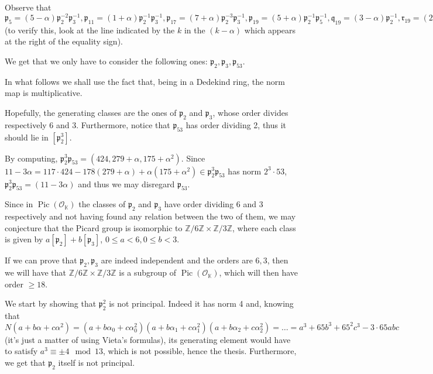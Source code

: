 \documentclass{article}
\newcommand{\numberset}{\mathbb}
\newcommand{\Z}{\numberset{Z}}
\newcommand{\K}{\numberset{K}}
\newcommand{\pid}{\mathfrak{p}}
\newcommand{\qid}{\mathfrak{q}}
\newcommand{\Pic}{\operatorname{Pic}}
\begin{document}
Observe that $\pid_5=(5-\alpha)\pid_2^{-2}\pid_3^{-1},\pid_{11}=(1+\alpha)\pid_2^{-1}\pid_3^{-1},\pid_{17}=(7+\alpha)\pid_2^{-3}\pid_3^{-1},\pid_{19}=(5+\alpha)\pid_2^{-1}\pid_5^{-1},\qid_{19}=(3-\alpha)\pid_2^{-1},\mathfrak{r}_{19}=(2-\alpha)\pid_3^{-1},\pid_{23}=(3+\alpha)\pid_2^{-2},\pid_{29}=(13+\alpha)\pid_3^{-1}\pid_{13}^{-1},\pid_{41}=(13-\alpha)\pid_2^{-2}\pid_{13}^{-1},\pid_{43}=(4+\alpha)\pid_3^{-1},\pid_{47}=(14-\alpha)\pid_3^{-1}\pid_{19}^{-1},\pid_{73}=(2+\alpha),\qid_{73}=(16+\alpha)\pid_3^{-1}\qid_{19}^{-1},\mathfrak{r}_{73}=(73)\pid_{73}^{-1}\qid_{73}^{-1}$ (to verify this, look at the line indicated by the $k$ in the $(k-\alpha)$ which appears at the right of the equality sign).

We get that we only have to consider the following ones: $\pid_2,\pid_3,\pid_{53}$.

In what follows we shall use the fact that, being in a Dedekind ring, the norm map is multiplicative.

Hopefully, the generating classes are the ones of $\pid_2$ and $\pid_3$, whose order divides respectively $6$ and $3$. Furthermore, notice that $\pid_{53}$ has order dividing 2, thus it should lie in $[\pid_2^3]$.

By computing, $\pid_2^3\pid_{53}=(424,279+\alpha,175+\alpha^2)$. Since $11-3\alpha=117\cdot 424-178(279+\alpha)+\alpha(175+\alpha^2)\in\pid_2^3\pid_{53}$ has norm $2^3\cdot 53$, $\pid_2^3\pid_{53}=(11-3\alpha)$ and thus we may disregard $\pid_{53}$.

Since in $\Pic(\mathcal{O}_{\K})$ the classes of $\pid_2$ and $\pid_3$ have order dividing 6 and 3 respectively and not having found any relation between the two of them, we may conjecture that the Picard group is isomorphic to $\Z/6\Z\times\Z/3\Z$, where each class is given by $a[\pid_2]+b[\pid_3]$, $0\leq a<6,0\leq b<3$.

If we can prove that $\pid_2,\pid_3$ are indeed independent and the orders are $6,3$, then we will have that $\Z/6\Z\times\Z/3\Z$ is a subgroup of $\Pic(\mathcal{O}_{\K})$, which will then have order $\geq 18$.

We start by showing that $\pid_2^2$ is not principal. Indeed it has norm 4 and, knowing that $N(a+b\alpha+c\alpha^2)=(a+b\alpha_0+c\alpha_0^2)(a+b\alpha_1+c\alpha_1^2)(a+b\alpha_2+c\alpha_2^2)=\ldots=a^3+65b^3+65^2c^3-3\cdot 65abc$ (it's just a matter of using Vieta's formulas), its generating element would have to satisfy $a^3\equiv\pm 4\mod 13$, which is not possible, hence the thesis. Furthermore, we get that $\pid_2$ itself is not principal.
\end{document}
